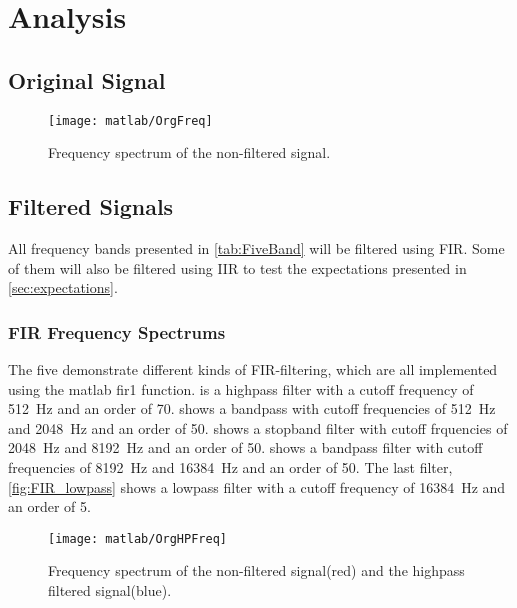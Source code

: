 
\section{Analysis}

\subsection{Original Signal}

\begin{figure}[!htb]
	\centering
	\texttt{[image: matlab/OrgFreq]}
	\caption{Frequency spectrum of the non-filtered signal.}
	\label{fig:orgfreq}
\end{figure}

\subsection{Filtered Signals}
All frequency bands presented in \cref{tab:FiveBand} will be filtered using FIR. Some of them will also be filtered using IIR to test the expectations presented in \cref{sec:expectations}.

\subsubsection{FIR Frequency Spectrums}
The five  demonstrate different kinds of FIR-filtering, which are all implemented using the matlab fir1 function.  is a highpass filter with a cutoff frequency of \SI{512}{\hertz} and an order of 70.  shows a bandpass with cutoff frequencies of \SI{512}{\hertz} and \SI{2048}{\hertz} and an order of 50.  shows a stopband filter with cutoff frquencies of \SI{2048}{\hertz} and \SI{8192}{\hertz} and an order of 50.  shows a bandpass filter with cutoff frequencies of \SI{8192}{\hertz} and \SI{16384}{\hertz} and an order of 50. The last filter, \cref{fig:FIR_lowpass} shows a lowpass filter with a cutoff frequency of \SI{16384}{\hertz} and an order of 5.

\begin{figure}[!htb]
	\centering
	\texttt{[image: matlab/OrgHPFreq]}
	\caption{Frequency spectrum of the non-filtered signal(red) and the highpass filtered signal(blue).}
	\label{fig:FIR_hipass}
\end{figure}

